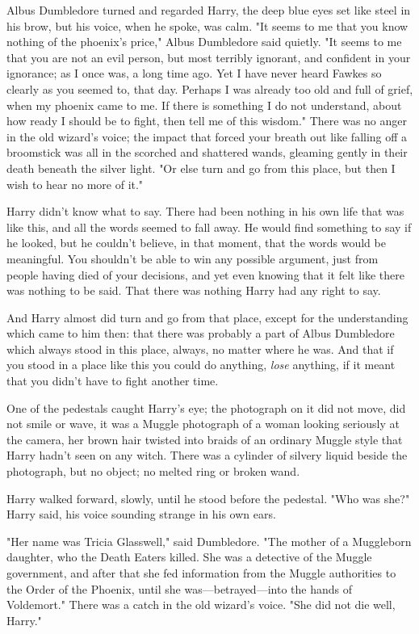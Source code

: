 Albus Dumbledore turned and regarded Harry, the deep blue eyes set like steel
in his brow, but his voice, when he spoke, was calm. "It seems to me that you
know nothing of the phoenix's price," Albus Dumbledore said quietly. "It seems
to me that you are not an evil person, but most terribly ignorant, and
confident in your ignorance; as I once was, a long time ago. Yet I have never
heard Fawkes so clearly as you seemed to, that day. Perhaps I was already too
old and full of grief, when my phoenix came to me. If there is something I do
not understand, about how ready I should be to fight, then tell me of this
wisdom." There was no anger in the old wizard's voice; the impact that forced
your breath out like falling off a broomstick was all in the scorched and
shattered wands, gleaming gently in their death beneath the silver light. "Or
else turn and go from this place, but then I wish to hear no more of it."

Harry didn't know what to say. There had been nothing in his own life that was
like this, and all the words seemed to fall away. He would find something to
say if he looked, but he couldn't believe, in that moment, that the words would
be meaningful. You shouldn't be able to win any possible argument, just from
people having died of your decisions, and yet even knowing that it felt like
there was nothing to be said. That there was nothing Harry had any right to say.

And Harry almost did turn and go from that place, except for the understanding
which came to him then: that there was probably a part of Albus Dumbledore
which always stood in this place, always, no matter where he was. And that if
you stood in a place like this you could do anything, \emph{lose} anything, if
it meant that you didn't have to fight another time.

One of the pedestals caught Harry's eye; the photograph on it did not move, did
not smile or wave, it was a Muggle photograph of a woman looking seriously at
the camera, her brown hair twisted into braids of an ordinary Muggle style that
Harry hadn't seen on any witch. There was a cylinder of silvery liquid beside
the photograph, but no object; no melted ring or broken wand.

Harry walked forward, slowly, until he stood before the pedestal. "Who was
she?" Harry said, his voice sounding strange in his own ears.

"Her name was Tricia Glasswell," said Dumbledore. "The mother of a Muggleborn
daughter, who the Death Eaters killed. She was a detective of the Muggle
government, and after that she fed information from the Muggle authorities to
the Order of the Phoenix, until she was---betrayed---into the hands of
Voldemort." There was a catch in the old wizard's voice. "She did not die well,
Harry."

